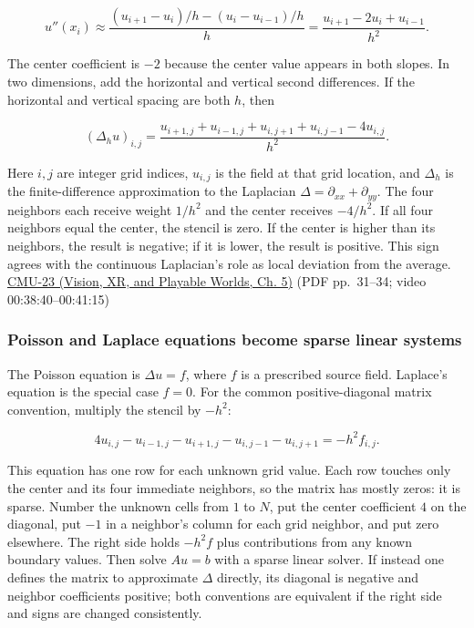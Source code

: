 \[
u''(x_i)\approx\frac{(u_{i+1}-u_i)/h-(u_i-u_{i-1})/h}{h}
=\frac{u_{i+1}-2u_i+u_{i-1}}{h^2}.
\]

The center coefficient is \(-2\) because the center value appears in both slopes. In two dimensions, add the horizontal and vertical second differences. If the horizontal and vertical spacing are both \(h\), then

\[
(\Delta_h u)_{i,j}=\frac{u_{i+1,j}+u_{i-1,j}+u_{i,j+1}+u_{i,j-1}-4u_{i,j}}{h^2}.
\]

Here \(i,j\) are integer grid indices, \(u_{i,j}\) is the field at that grid location, and \(\Delta_h\) is the finite-difference approximation to the Laplacian \(\Delta=\partial_{xx}+\partial_{yy}\). The four neighbors each receive weight \(1/h^2\) and the center receives \(-4/h^2\). If all four neighbors equal the center, the stencil is zero. If the center is higher than its neighbors, the result is negative; if it is lower, the result is positive. This sign agrees with the continuous Laplacian's role as local deviation from the average. \href{../07-Vision-XR-and-Playable-Worlds/main.pdf\#nameddest=04-visual-computing-ii-ch036-cmu-23---physically-based-animation-and-pdes}{CMU-23 (Vision, XR, and Playable Worlds, Ch. 5)} (PDF pp.~31--34; video 00:38:40--00:41:15)

\subsubsection{Poisson and Laplace equations become sparse linear systems}\label{04-visual-computing-ii-ch030-poisson-and-laplace-equations-become-sparse-linear-systems}

\hypertarget{04-visual-computing-ii-ch030-poisson-and-laplace-equations-become-sparse-linear-systems}{}

The Poisson equation is \(\Delta u=f\), where \(f\) is a prescribed source field. Laplace's equation is the special case \(f=0\). For the common positive-diagonal matrix convention, multiply the stencil by \(-h^2\):

\[
4u_{i,j}-u_{i-1,j}-u_{i+1,j}-u_{i,j-1}-u_{i,j+1}=-h^2f_{i,j}.
\]

This equation has one row for each unknown grid value. Each row touches only the center and its four immediate neighbors, so the matrix has mostly zeros: it is sparse. Number the unknown cells from \(1\) to \(N\), put the center coefficient \(4\) on the diagonal, put \(-1\) in a neighbor's column for each grid neighbor, and put zero elsewhere. The right side holds \(-h^2f\) plus contributions from any known boundary values. Then solve \(Au=b\) with a sparse linear solver. If instead one defines the matrix to approximate \(\Delta\) directly, its diagonal is negative and neighbor coefficients positive; both conventions are equivalent if the right side and signs are changed consistently.

